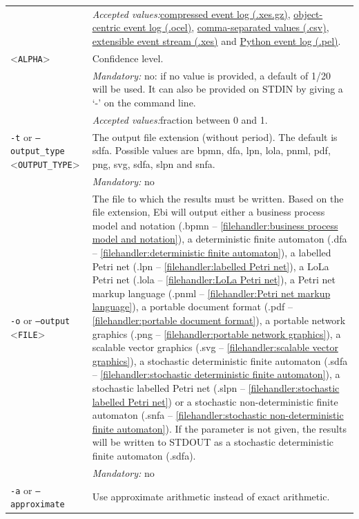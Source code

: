 {\begin{tabularx}{\linewidth}{lX}
&\textit{Accepted values:}\quad \hyperref[filehandler:compressed event log]{compressed event log (.xes.gz)}, \hyperref[filehandler:object-centric event log]{object-centric event log (.ocel)}, \hyperref[filehandler:comma-separated values]{comma-separated values (.csv)}, \hyperref[filehandler:extensible event stream]{extensible event stream (.xes)} and \hyperref[filehandler:Python event log]{Python event log (.pel)}.\\
<\texttt{ALPHA}>&Confidence level.\\
&\textit{Mandatory:} \quad no: if no value is provided, a default of 1/20 will be used. It can also be provided on STDIN by giving a `-' on the command line.\\
&\textit{Accepted values:}\quad fraction between 0 and 1.\\
\texttt{-t} or \texttt{--output\_type} <\texttt{OUTPUT\_TYPE}> &
The output file extension (without period). The default is sdfa. Possible values are bpmn, dfa, lpn, lola, pnml, pdf, png, svg, sdfa, slpn and snfa.\\
&\textit{Mandatory:} \quad no\\
\texttt{-o} or \texttt{--output} <\texttt{FILE}> &
The file to which the results must be written. Based on the file extension, Ebi will output either a business process model and notation (.bpmn -- \cref{filehandler:business process model and notation}), a deterministic finite automaton (.dfa -- \cref{filehandler:deterministic finite automaton}), a labelled Petri net (.lpn -- \cref{filehandler:labelled Petri net}), a LoLa Petri net (.lola -- \cref{filehandler:LoLa Petri net}), a Petri net markup language (.pnml -- \cref{filehandler:Petri net markup language}), a portable document format (.pdf -- \cref{filehandler:portable document format}), a portable network graphics (.png -- \cref{filehandler:portable network graphics}), a scalable vector graphics (.svg -- \cref{filehandler:scalable vector graphics}), a stochastic deterministic finite automaton (.sdfa -- \cref{filehandler:stochastic deterministic finite automaton}), a stochastic labelled Petri net (.slpn -- \cref{filehandler:stochastic labelled Petri net}) or a stochastic non-deterministic finite automaton (.snfa -- \cref{filehandler:stochastic non-deterministic finite automaton}).
If the parameter is not given, the results will be written to STDOUT as a stochastic deterministic finite automaton (.sdfa).\\
&\textit{Mandatory:} \quad no\\
\texttt{-a} or \texttt{--approximate} & Use approximate arithmetic instead of exact arithmetic.\\

\end{tabularx}}

